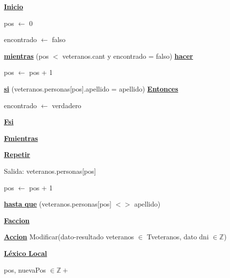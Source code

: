 \documentclass{article}
\begin{document}
        \hspace{8mm}\underline{\textbf{Inicio}}

            \hspace{12mm} pos $\leftarrow$ 0

            \hspace{12mm} encontrado $\leftarrow$ falso

            \hspace{12mm}\underline{\textbf{mientras}} (pos $<$ veteranos.cant y encontrado = falso) \underline{\textbf{hacer}}

                \hspace{16mm}pos $\leftarrow$ pos + 1

                \hspace{16mm}\underline{\textbf{si}} (veteranos.personas[pos].apellido = apellido) \underline{\textbf{Entonces}}

                    \hspace{20mm}encontrado $\leftarrow$ verdadero

                \hspace{16mm}\underline{\textbf{Fsi}}

            \hspace{12mm}\underline{\textbf{Fmientras}}

            \hspace{12mm}\underline{\textbf{Repetir}}

                \hspace{16mm}Salida: veteranos.personas[pos]

                \hspace{16mm}pos $\leftarrow$ pos + 1

            \hspace{12mm}\underline{\textbf{hasta que}} (veteranos.personas[pos] $<>$ apellido)

    \hspace{4mm}\underline{\textbf{Faccion}}

    \vspace{4mm}

    \hspace{4mm}\underline{\textbf{Accion}} Modificar(dato-resultado veteranos $\in$ Tveteranos, dato dni $\in \mathbb{Z}$)

        \hspace{8mm}\underline{\textbf{Léxico Local}}

            \hspace{12mm}pos, nuevaPos $\in \mathbb{Z}+$
\end{document}
